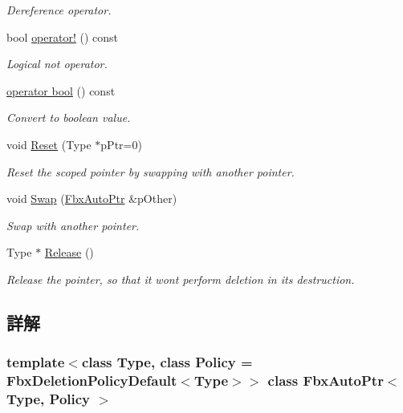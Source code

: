 \begin{DoxyCompactItemize}
\begin{DoxyCompactList}\small\item\em Dereference operator. \end{DoxyCompactList}\item 
bool \hyperlink{class_fbx_auto_ptr_afc9bb02ba900f9920772416291690f45}{operator!} () const
\begin{DoxyCompactList}\small\item\em Logical not operator. \end{DoxyCompactList}\item 
\hyperlink{class_fbx_auto_ptr_ae92a5d1428b0ce74491aab76f8535b4c}{operator bool} () const
\begin{DoxyCompactList}\small\item\em Convert to boolean value. \end{DoxyCompactList}\item 
void \hyperlink{class_fbx_auto_ptr_ab0b755d84668c33b007a3311adb2b9e1}{Reset} (Type $\ast$p\+Ptr=0)
\begin{DoxyCompactList}\small\item\em Reset the scoped pointer by swapping with another pointer. \end{DoxyCompactList}\item 
void \hyperlink{class_fbx_auto_ptr_a46656f93e4ec91ece72fb90b9091fd2c}{Swap} (\hyperlink{class_fbx_auto_ptr}{Fbx\+Auto\+Ptr} \&p\+Other)
\begin{DoxyCompactList}\small\item\em Swap with another pointer. \end{DoxyCompactList}\item 
Type $\ast$ \hyperlink{class_fbx_auto_ptr_ab9460afa835fdaa907bf0ae32f939b8e}{Release} ()
\begin{DoxyCompactList}\small\item\em Release the pointer, so that it won\textquotesingle{}t perform deletion in its destruction. \end{DoxyCompactList}\end{DoxyCompactItemize}


\subsection{詳解}
\subsubsection*{template$<$class Type, class Policy = Fbx\+Deletion\+Policy\+Default$<$\+Type$>$$>$\newline
class Fbx\+Auto\+Ptr$<$ Type, Policy $>$}

